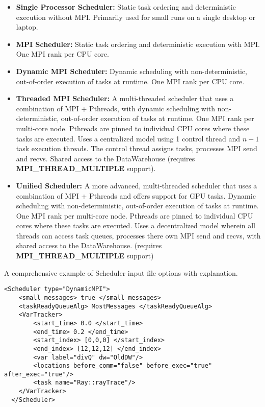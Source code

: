 \begin{itemize}
  \item \textbf{Single Processor Scheduler:} Static task ordering and
      deterministic execution without MPI. Primarily used for small runs on
      a
      single desktop or laptop.
  \item \textbf{MPI Scheduler:} Static task ordering and deterministic
      execution with MPI. One MPI rank per CPU core.
  \item \textbf{Dynamic MPI Scheduler:} Dynamic scheduling with
      non-deterministic, out-of-order execution of tasks at runtime. One MPI
      rank per CPU core.
  \item \textbf{Threaded MPI Scheduler:} A multi-threaded scheduler that
      uses
      a combination of MPI + Pthreads, with dynamic scheduling with
      non-deterministic, out-of-order execution of tasks at runtime. One MPI
      rank per multi-core node. Pthreads are pinned to individual CPU cores
      where these tasks are executed. Uses a centralized model using 1
      control thread and $n-1$ task execution threads. The control thread
      assigns tasks, processes MPI send and recvs. Shared access to the
      DataWarehouse (requires \textbf{MPI\_THREAD\_MULTIPLE} support).
  \item \textbf{Unified Scheduler:} A more advanced, multi-threaded
      scheduler
      that uses a combination of MPI + Pthreads and offers support for GPU
      tasks. Dynamic scheduling with non-deterministic, out-of-order
      execution of tasks at runtime. One MPI rank per multi-core node.
      Pthreads are pinned to individual CPU cores where these tasks are
      executed. Uses a decentralized model wherein all threads can access
      task queues, processes there own MPI send and recvs, with shared
      access
      to the DataWarehouse. (requires \textbf{MPI\_THREAD\_MULTIPLE}
      support)
\end{itemize}

\noindent A comprehensive example of Scheduler input file options with
explanation.

\begin{Verbatim}[fontsize=\footnotesize]
  <Scheduler type="DynamicMPI">
    <small_messages> true </small_messages>
    <taskReadyQueueAlg> MostMessages </taskReadyQueueAlg>
    <VarTracker>
        <start_time> 0.0 </start_time>
        <end_time> 0.2 </end_time>
        <start_index> [0,0,0] </start_index>
        <end_index> [12,12,12] </end_index>
        <var label="divQ" dw="OldDW"/>
        <locations before_comm="false" before_exec="true" after_exec="true"/>
        <task name="Ray::rayTrace"/>
    </VarTracker>
  </Scheduler>
\end{Verbatim}

